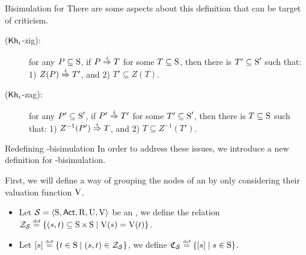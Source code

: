 \documentclass{beamer}
\begin{document}


\begin{frame}{Bisimulation for \KHilogic}
    There are some aspects about this definition that can be target of criticism. \pause
    
    \begin{description}
        \item[(${\operatorname{\sf Kh}_i}$-zig):] for any  $P \subseteq \operatorname{S}$, if $P \stackrel{i}{\Rightarrow} T$ for some $T \subseteq \operatorname{S}$, then there is $T' \subseteq \operatorname{S}'$ such that: 
            1) $Z(P) \stackrel{i}{\Rightarrow} T'$, and
            2) $T' \subseteq Z(T)$.

        \item[(${\operatorname{\sf Kh}_i}$-zag):] %
        for any  $P' \subseteq \operatorname{S}'$, if $P' \stackrel{i}{\Rightarrow} T'$ for some $T' \subseteq \operatorname{S}'$, then there is $T \subseteq \operatorname{S}$ such that: 
            1) $Z^{-1}(P') \stackrel{i}{\Rightarrow} T$, and
            2) $T \subseteq Z^{-1}(T')$.
    \end{description}


\end{frame}


\begin{frame}{Redefining \KHilogic-bisimulation}
    In order to address these issues, we introduce a new definition for \KHilogic-bisimulation. \pause


    First, we will define a way of grouping the nodes of an \ults by only considering their valuation function $\operatorname{V}$.\pause

    \vspace{3mm}

    \begin{definition}
        \begin{small}
        \begin{itemize}
            \item Let $\mathcal{S}=\langle \operatorname{S},{\rm \sf Act},\operatorname{R},\operatorname{U},\operatorname{V} \rangle$ be an \ults, we define the relation \\\quad\quad\quad\quad$\quotient{\model}\eqdef\set{(s,t) \subseteq \W\times\W\mid \V(s)=\V(t)}$.\pause
            \item Let $[s]\eqdef \set{t\in\W\mid (s,t)\in\quotient{\model}}$, we define $\qpart{\model}\eqdef\set{[s]\mid s\in\W}$.
        \end{itemize}
        \end{small}
    \end{definition}
\end{frame}
\end{document}
